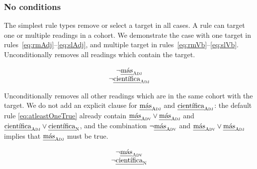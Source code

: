 


\subsubsection{No conditions}

The simplest rule types remove or select a target in all cases.
A rule can target one or multiple readings in a cohort. We demonstrate the case with one target in rules~\ref{eq:rmAdj}--\ref{eq:slAdj}, and multiple target in rules~\ref{eq:rmVb}--\ref{eq:slVb}. \\


 Unconditionally removes all readings which contain the target.

\begin{equation}
\begin{array}{c}
\neg{}\masAdj \\
\neg{}\cientificaAdj
\end{array}
\label{eq:rmAdj}
\end{equation}

 Unconditionally removes all other readings which are in the same cohort with the target.
We do not add an explicit clause for $\text{\em m\'{a}s}_{\text{\sc Adj}}$ and $\cientificaAdj$: the default rule \ref{eq:atleastOneTrue} already contain $\text{\em m\'{a}s}_{\text{\sc Adv}} \vee \text{\em m\'{a}s}_{\text{\sc Adj}}$ and $\cientificaAdj \vee \cientificaN$, and the combination $\neg\text{\em m\'{a}s}_{\text{\sc Adv}}$  and $\text{\em m\'{a}s}_{\text{\sc Adv}} \vee \text{\em m\'{a}s}_{\text{\sc Adj}}$  implies that $\text{\em m\'{a}s}_{\text{\sc Adj}}$ must be true.

\begin{equation}
\begin{array}{c}
\neg{}\masAdv \\
\neg{}\cientificaN
\end{array}
\label{eq:slAdj}
\end{equation}

